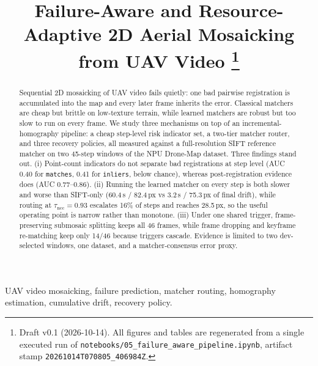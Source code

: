 \documentclass[conference]{IEEEtran}
\begin{document}
\title{Failure-Aware and Resource-Adaptive 2D Aerial Mosaicking from UAV Video%
\thanks{Draft v0.1 (2026-10-14). All figures and tables are regenerated from a
single executed run of \texttt{notebooks/05\_failure\_aware\_pipeline.ipynb},
artifact stamp \texttt{20261014T070805\_406984Z}.}}

\author{
}

\maketitle

\begin{abstract}
Sequential 2D mosaicking of UAV video fails quietly: one bad pairwise
registration is accumulated into the map and every later frame inherits the
error. Classical matchers are cheap but brittle on low-texture terrain, while
learned matchers are robust but too slow to run on every frame. We study three
mechanisms on top of an incremental-homography pipeline: a cheap step-level
risk indicator set, a two-tier matcher router, and three recovery policies,
all measured against a full-resolution SIFT reference matcher on two 45-step
windows of the NPU Drone-Map dataset. Three findings stand out.
(i) Point-count indicators do not separate bad registrations at step level
(AUC 0.40 for \texttt{matches}, 0.41 for \texttt{inliers}, below chance),
whereas post-registration evidence does (AUC 0.77--0.86).
(ii) Running the learned matcher on every step is both slower and worse than
SIFT-only (60.4\,s / 82.4\,px vs 3.2\,s / 75.3\,px of final drift), while
routing at $\tau_{\mathrm{ncc}}{=}0.93$ escalates 16\% of steps and reaches
28.5\,px, so the useful operating point is narrow rather than monotone.
(iii) Under one shared trigger, frame-preserving submosaic splitting keeps all
46 frames, while frame dropping and keyframe re-matching keep only 14/46
because triggers cascade. Evidence is limited to two dev-selected windows,
one dataset, and a matcher-consensus error proxy.
\end{abstract}

\begin{IEEEkeywords}
UAV video mosaicking, failure prediction, matcher routing, homography
estimation, cumulative drift, recovery policy.
\end{IEEEkeywords}
\end{document}
